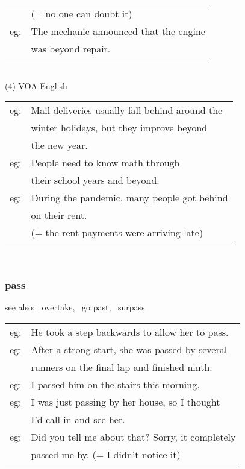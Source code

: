 \documentclass[14pt, t]{beamer}
\begin{document}
\begin{frame}[allowframebreaks]
\begin{tabular}{ll}
& (= no one can doubt it) \\[2pt]
eg: & The mechanic announced that the engine \\
& was beyond repair. \\
\end{tabular} \\
\framebreak
(4) VOA English \\[2pt]
\begin{tabular}{ll}
eg: & Mail deliveries usually fall behind around the \\
& winter holidays, but they improve beyond\\
& the new year. \\[2pt]
eg: & People need to know math through \\
& their school years and beyond. \\[2pt]
eg: & During the pandemic, many people got behind \\
& on their rent. \\
& (= the rent payments were arriving late) \\
\end{tabular} \\
\end{frame}
\begin{frame}
\frametitle{pass}
see also: \, overtake, \, go past, \, surpass \\[2pt]
\begin{tabular}{ll}
eg: & He took a step backwards to allow her to pass. \\[2pt]
eg: & After a strong start, she was passed by several \\
&  runners on the final lap and finished ninth. \\[2pt]
eg: & I passed him on the stairs this morning. \\
eg: & I was just passing by her house, so I thought \\
& I'd call in and see her. \\[2pt]
eg: & Did you tell me about that? Sorry, it completely  \\
& passed me by. \quad (= I didn't notice it) \\[2pt]
\end{tabular} \\
\end{frame}
\end{document}
